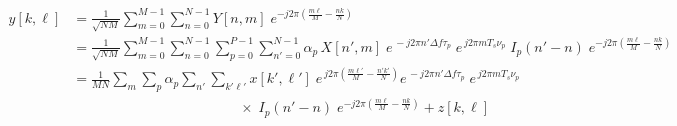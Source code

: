 \documentclass[12pt]{article}
\begin{document}
\begin{align}
  y[k,\ell]
  &= \frac{1}{\sqrt{NM}}
     \sum_{m=0}^{M-1}\sum_{n=0}^{N-1}
     Y[n,m]\;e^{-j2\pi\!\left(\frac{m\ell}{M}-\frac{nk}{N}\right)}
  \nonumber\\[6pt]
  &= \frac{1}{\sqrt{NM}}
     \sum_{m=0}^{M-1}\sum_{n=0}^{N-1}
     \sum_{p=0}^{P-1}\sum_{n'=0}^{N-1}
     \alpha_p\,X[n',m]\;
     e^{\,-j2\pi n'\Delta f\tau_p}\;
     e^{\,j2\pi m T_s\nu_p}\;
     I_p(n'-n)\;
     e^{-j2\pi\!\left(\frac{m\ell}{M}-\frac{nk}{N}\right)}
  \nonumber\\[6pt]
  &= \frac{1}{MN}
     \sum_{m}\sum_{p}\alpha_p
     \sum_{n'}\sum_{k'\ell'}
     x[k',\ell']\;
     e^{\,j2\pi\!\left(\frac{m\ell'}{M}-\frac{n'k'}{N}\right)}
     e^{\,-j2\pi n'\Delta f\tau_p}\;
     e^{\,j2\pi m T_s\nu_p}
  \nonumber\\
  &\hspace{5cm}
     \times\;
     I_p(n'-n)\;
     e^{-j2\pi\!\left(\frac{m\ell}{M}-\frac{nk}{N}\right)}
     + z[k,\ell]
\end{align}
\end{document}
